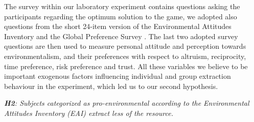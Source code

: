  The survey within our laboratory experiment contains questions asking the participants regarding the optimum solution to the game, we adopted also questions from the short 24-item version of the Environmental Attitudes Inventory \cite{milfont2007} and the Global Preference Survey \cite{falk2018global}. The last two adopted survey questions are then used to measure personal attitude and perception towards environmentalism, and their preferences with respect to altruism, reciprocity, time preference, risk preference and trust. All these variables we believe to be important exogenous factors influencing individual and group extraction behaviour in the experiment, which led us to our second hypothesis.

\medskip
\begin{adjustbox}{minipage=.7\textwidth,margin=0pt \smallskipamount,center}
    \itshape \noindent \textbf{H2}: Subjects categorized as pro-environmental according to the Environmental Attitudes Inventory (EAI) extract less of the resource.
\end{adjustbox}
\medskip
